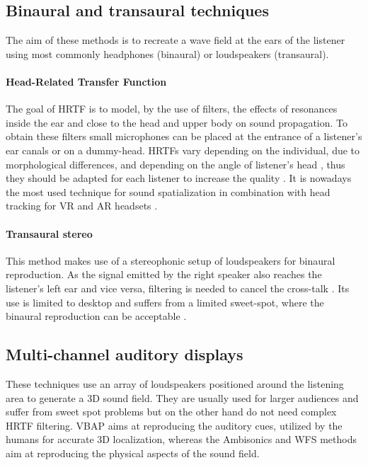 \subsection{Binaural and transaural techniques}

The aim of these methods is to recreate a wave field at the ears of the listener using most commonly headphones (binaural) or loudspeakers (transaural).

\paragraph{Head-Related Transfer Function\\}\label{par:hrtf}

The goal of \gls{HRTF} is to model, by the use of filters, the effects of resonances inside the ear and close to the head and upper body on sound propagation. To obtain these filters small microphones can be placed at the entrance of a listener's ear canals or on a dummy-head. \gls{HRTF}s vary depending on the individual, due to morphological differences, and depending on the angle of listener's head \cite{zhang2013measurement}, thus they should be adapted for each listener to increase the quality \cite{funkhouser2002sounds}. It is nowadays the most used technique for sound spatialization in combination with head tracking for \gls{VR} and \gls{AR} headsets \cite{bib:hololens, bib:oculus}. 

\paragraph{Transaural stereo\\}\label{par:transaural}

This method makes use of a stereophonic setup of loudspeakers for binaural reproduction. As the signal emitted by the right speaker also reaches the listener's left ear and vice versa, filtering is needed to cancel the cross-talk . Its use is limited to desktop and suffers from a limited sweet-spot, where the binaural reproduction can be acceptable \cite{funkhouser2002sounds}.

\subsection{Multi-channel auditory displays}

These techniques use an array of loudspeakers positioned around the listening area to generate a 3D sound field. They are usually used for larger audiences and suffer from sweet spot problems but on the other hand do not need complex  \gls{HRTF} filtering. VBAP aims at reproducing the auditory cues, utilized by the humans for accurate 3D localization, whereas the Ambisonics and WFS methods aim at reproducing the physical aspects of the sound field. 

